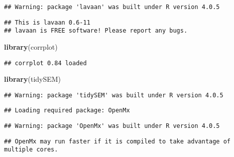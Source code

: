 \documentclass[
]{article}
\newenvironment{Shaded}{\begin{snugshade}}{\end{snugshade}}
\newcommand{\KeywordTok}[1]{\textcolor[rgb]{0.13,0.29,0.53}{\textbf{#1}}}
\newcommand{\NormalTok}[1]{#1}
\begin{document}
\begin{verbatim}
## Warning: package 'lavaan' was built under R version 4.0.5
\end{verbatim}

\begin{verbatim}
## This is lavaan 0.6-11
## lavaan is FREE software! Please report any bugs.
\end{verbatim}

\begin{Shaded}
\begin{Highlighting}[]
\KeywordTok{library}\NormalTok{(corrplot)}
\end{Highlighting}
\end{Shaded}

\begin{verbatim}
## corrplot 0.84 loaded
\end{verbatim}

\begin{Shaded}
\begin{Highlighting}[]
\KeywordTok{library}\NormalTok{(tidySEM)}
\end{Highlighting}
\end{Shaded}

\begin{verbatim}
## Warning: package 'tidySEM' was built under R version 4.0.5
\end{verbatim}

\begin{verbatim}
## Loading required package: OpenMx
\end{verbatim}

\begin{verbatim}
## Warning: package 'OpenMx' was built under R version 4.0.5
\end{verbatim}

\begin{verbatim}
## OpenMx may run faster if it is compiled to take advantage of multiple cores.
\end{verbatim}
\end{document}
